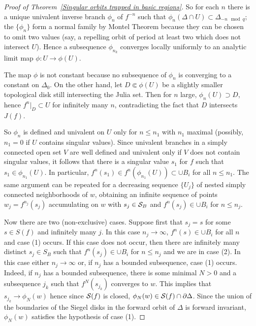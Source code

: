 \documentclass[11pt, twoside]{article}
\theoremstyle{definition}
\newcommand{\ra}{\rightarrow}
\newcommand{\PP}{{\cal P}}
\renewcommand{\SS}{{\cal S}}
\newcommand{\De}{\Delta}
\begin{document}
\begin{proof}[Proof of Theorem~\ref{Singular orbits trapped in basic regions}]
 
 So  for each $n$ there is a unique univalent  inverse branch  $\phi_n$ of $f^{-n}$ such that 
$\phi_n(\De\cap U)\subset \De_{-n\mod q}$; the  $\{\phi_n\}$ form a normal family by Montel Theorem because they can be chosen to omit two values (say, a repelling orbit of period at least two which does not intersect $U$). 
 Hence a subsequence $\phi_{n_k}$ converges locally uniformly to an analytic limit map $\phi: U\ra \phi(U)$. 
 
  The map $\phi$ is not constant because no subsequence of $\phi_n$ is  converging to a constant on  $\De_0$. %
On the other hand, let $D\Subset \phi(U)$ be a slightly smaller topological disk still intersecting the Julia set. Then for $n$ large, $\phi_n(U)\supset D$, hence   $f^{n}|_{D}\subset U$ for infinitely many $n$, contradicting the fact that $D$ intersects $J(f)$.

So $\phi_n$ is defined and univalent on $U$ only for $n\leq n_1$ with $n_1$ maximal (possibly, $n_1=0$ if $U$ contains singular values). Since univalent branches in a simply connected open set $V$ are well defined and univalent only if $V$ does not contain singular values, it follows that there is a singular value $s_1$ for $f$ such that $s_1\in \phi_{n_1}(U)$. In particular, $f^n(s_1)\in f^n(\phi_{n_1}(U))\subset \cup B_i$ for all $n\leq n_1$.  
  The same  argument can be repeated for a decreasing sequence $\{U_j\}$ of nested simply connected neighborhoods of $w$, obtaining    an infinite sequence of points $w_j=f^{n_j}(s_j)$ accumulating on $w$ with $s_j\in \SS_B$ and $f^n(s_j)\in \cup B_i$ for $n\leq n_j$.  
    
    
Now there are two (non-exclusive) cases.     Suppose first that  $s_j=s$ for some $s\in S(f)$ and infinitely many $j$. In this case $n_j\ra\infty$,   $f^n(s)\in \cup B_i$ for all $n$ and  case (1) occurs.  
 If this case does not occur, then there are infinitely many distinct $s_j\in S_B$ such that $f^n(s_j)\in \cup B_i$ for $n\leq n_j$ and we are in case (2). 
 In this case either  $n_j\ra\infty$ or, if $n_j$ has a bounded subsequence,   case (1) occurs.   Indeed, if $n_j$ has a bounded subsequence, there is some minimal $N>0$ and a subsequence $j_k$ such that $f^{N}(s_{j_k})$ converges to $w$. This implies that $s_{j_k}\ra \phi_N(w)$ hence since $\SS(f)$ is closed, $\phi_N(w)\in \SS(f)\cap\partial\Delta$. Since the union of the boundaries of the Siegel disks in the forward orbit of $\Delta$ is forward invariant,  $\phi_N(w)$ satisfies the hypothesis of case (1).
 

\end{proof}
\end{document}
